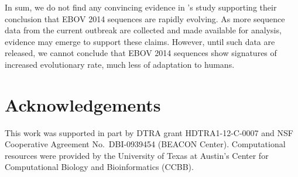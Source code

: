 \documentclass[11pt]{article}
\begin{document}

In sum, we do not find any convincing evidence in \citet{Gire2014}'s study supporting their conclusion that EBOV 2014 sequences are rapidly evolving. As more sequence data from the current outbreak are collected and made available for analysis, evidence may emerge to support these claims. However, until such data are released, we cannot conclude that EBOV 2014 sequences show signatures of increased evolutionary rate, much less of adaptation to humans.

\section*{Acknowledgements}
This work was supported in part by DTRA grant HDTRA1-12-C-0007 and NSF Cooperative Agreement No.\ DBI-0939454 (BEACON Center). Computational resources were provided by the University of Texas at Austin's Center for Computational Biology and Bioinformatics (CCBB).




\clearpage
\end{document}
